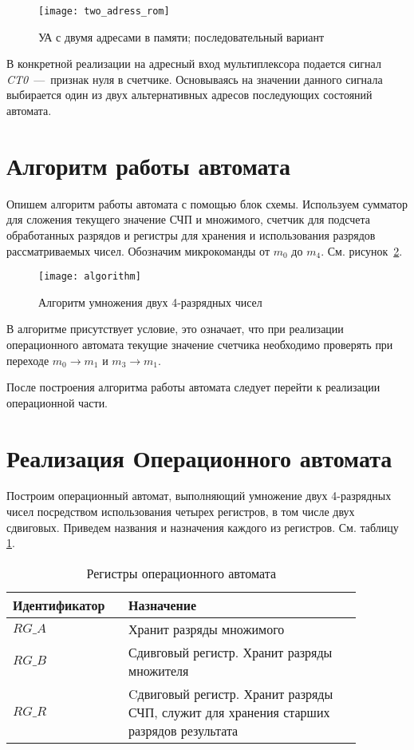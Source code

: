 \documentclass[a4paper,14pt]{extarticle}
\begin{document}
\begin{figure}[h!]
	\begin{center}
		\texttt{[image: two\_adress\_rom]}
		\caption{УА с двумя адресами в памяти; последовательный вариант}
		\label{img:scheme}
	\end{center}	
\end{figure}

В конкретной реализации на адресный вход мультиплексора подается сигнал \textit{CT0}~---~признак нуля в счетчике. Основываясь на значении данного сигнала выбирается один из двух альтернативных адресов последующих состояний автомата.
\newpage
\section{Алгоритм работы автомата}
Опишем алгоритм работы автомата с помощью блок схемы. Используем сумматор для сложения текущего значение СЧП и множимого, счетчик для подсчета обработанных разрядов и регистры для хранения и использования разрядов рассматриваемых чисел. Обозначим микрокоманды от $m_0$ до $m_4$. См. рисунок~\ref{img:algorithm}.\vspace{2ex}

\begin{figure}[h!]
	\centering
	\texttt{[image: algorithm]}
	\caption {Алгоритм умножения двух 4-разрядных чисел}
	\label{img:algorithm}
\end{figure}

В алгоритме присутствует условие, это означает, что при реализации операционного автомата текущие значение счетчика необходимо проверять при переходе $m_0 \to m_1$ и $m_3 \to m_1$.

После построения алгоритма работы автомата следует перейти к реализации операционной части.

\section {Реализация Операционного автомата}
Построим операционный автомат, выполняющий умножение двух 4-разрядных чисел посредством использования четырех регистров, в том числе двух сдвиговых. Приведем названия и назначения каждого из регистров. См. таблицу \ref{tab:regs}.
\begin{table}[h!]
	\centering
		\begin{tabular}{|p{0.27\linewidth}|p{0.6\linewidth}|}
			\hline
			\textbf{Идентификатор} & \textbf{Назначение} \\ \hline
			$RG\_A$ & Хранит разряды множимого \\ \hline
			$RG\_B$ & Сдивговый регистр. Хранит разряды множителя \\ \hline
			$RG\_R$ & Cдвиговый регистр. Хранит разряды СЧП, служит для хранения старших разрядов результата \\ \hline
		\end{tabular}
		\caption{Регистры операционного автомата}
		\label{tab:regs}
\end{table}
\end{document}
